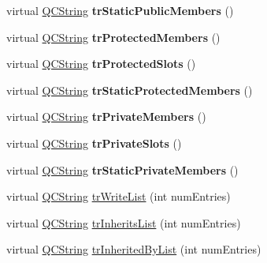 \begin{DoxyCompactItemize}
virtual \mbox{\hyperlink{class_q_c_string}{Q\+C\+String}} {\bfseries tr\+Static\+Public\+Members} ()
\item 
\mbox{\label{class_translator_serbian_cyrillic_a625493fc12ecfdb5d6e9affd7d022530}} 
virtual \mbox{\hyperlink{class_q_c_string}{Q\+C\+String}} {\bfseries tr\+Protected\+Members} ()
\item 
\mbox{\label{class_translator_serbian_cyrillic_a9e83cbac88917f938ea61a34bfc60d79}} 
virtual \mbox{\hyperlink{class_q_c_string}{Q\+C\+String}} {\bfseries tr\+Protected\+Slots} ()
\item 
\mbox{\label{class_translator_serbian_cyrillic_a7c344f16b109aa0feb26686b6f2617f4}} 
virtual \mbox{\hyperlink{class_q_c_string}{Q\+C\+String}} {\bfseries tr\+Static\+Protected\+Members} ()
\item 
\mbox{\label{class_translator_serbian_cyrillic_abe373cf6585ffa10560fd1b453f7abfe}} 
virtual \mbox{\hyperlink{class_q_c_string}{Q\+C\+String}} {\bfseries tr\+Private\+Members} ()
\item 
\mbox{\label{class_translator_serbian_cyrillic_a53804f99d9825fc5d860e27c377c365f}} 
virtual \mbox{\hyperlink{class_q_c_string}{Q\+C\+String}} {\bfseries tr\+Private\+Slots} ()
\item 
\mbox{\label{class_translator_serbian_cyrillic_a3d6f1fe7e9eed47e59d53d5f70ed399b}} 
virtual \mbox{\hyperlink{class_q_c_string}{Q\+C\+String}} {\bfseries tr\+Static\+Private\+Members} ()
\item 
virtual \mbox{\hyperlink{class_q_c_string}{Q\+C\+String}} \mbox{\hyperlink{class_translator_serbian_cyrillic_a81566dcedef6e5bea69d42cbc36ce9d8}{tr\+Write\+List}} (int num\+Entries)
\item 
virtual \mbox{\hyperlink{class_q_c_string}{Q\+C\+String}} \mbox{\hyperlink{class_translator_serbian_cyrillic_ab9c7c32c3505482a0bf58bb69dede806}{tr\+Inherits\+List}} (int num\+Entries)
\item 
virtual \mbox{\hyperlink{class_q_c_string}{Q\+C\+String}} \mbox{\hyperlink{class_translator_serbian_cyrillic_aedcfd05bfcadc55ac5ed9e78320ec3ca}{tr\+Inherited\+By\+List}} (int num\+Entries)

\end{DoxyCompactItemize}
